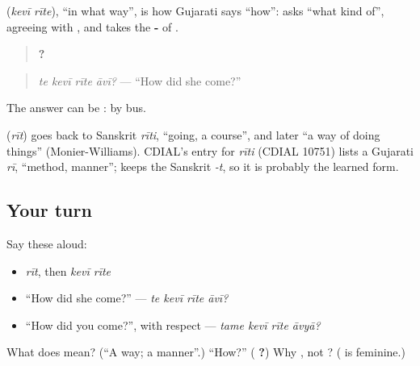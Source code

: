 \textbf{ } (\emph{kevī rīte}), \textquotedblleft{}in what way\textquotedblright{}, is how Gujarati says \textquotedblleft{}how\textquotedblright{}: \textbf{} asks \textquotedblleft{}what kind of\textquotedblright{}, agreeing with \textbf{}, and \textbf{} takes the \textbf{-} of \textbf{}.

\begin{quote}
\textbf{   ?}
\end{quote}

\begin{quote}
\emph{te kevī rīte āvī?} — \textquotedblleft{}How did she come?\textquotedblright{}
\end{quote}

The answer can be \textbf{}: by bus.

\begin{cousinweb}
\textbf{} (\emph{rīt}) goes back to Sanskrit \emph{rīti}, \textquotedblleft{}going, a course\textquotedblright{}, and later \textquotedblleft{}a way of doing things\textquotedblright{} (Monier-Williams). CDIAL's entry for \emph{rīti} (CDIAL 10751) lists a Gujarati \emph{rī}, \textquotedblleft{}method, manner\textquotedblright{}; \textbf{} keeps the Sanskrit \emph{-t}, so it is probably the learned form.
\end{cousinweb}

\subsection*{Your turn}
Say these aloud:

\begin{itemize}
\raggedright
  \item \emph{rīt}, then \emph{kevī rīte}
  \item \textquotedblleft{}How did she come?\textquotedblright{} — \emph{te kevī rīte āvī?}
  \item \textquotedblleft{}How did you come?\textquotedblright{}, with respect — \emph{tame kevī rīte āvyā?}
\end{itemize}

\begin{tcolorbox}[breakable,colback=teal!4,colframe=teal!35!black,title={Before you move on}]
What does \textbf{} mean? (\textquotedblleft{}A way; a manner\textquotedblright{}.) \textquotedblleft{}How?\textquotedblright{} (\textbf{ ?}) Why \textbf{}, not \textbf{}? (\textbf{} is feminine.)
\end{tcolorbox}
